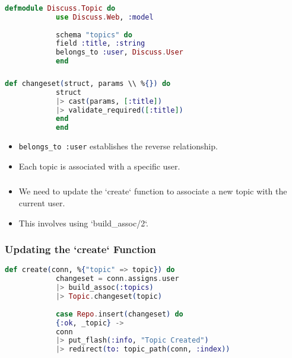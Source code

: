 \documentclass[aspectratio=169, table]{beamer}
\begin{document}
	\begin{frame}[fragile]
		\frametitle{}
		\begin{lstlisting}[language=Elixir]
			defmodule Discuss.Topic do
			use Discuss.Web, :model
			
			schema "topics" do
			field :title, :string
			belongs_to :user, Discuss.User
			end
		\end{lstlisting}
	\end{frame}
	
	\begin{frame}[fragile]
		\frametitle{}
		\begin{lstlisting}[language=Elixir]
			def changeset(struct, params \\ %{}) do
			struct
			|> cast(params, [:title])
			|> validate_required([:title])
			end
			end
		\end{lstlisting}
		\begin{itemize}
			\item \texttt{belongs\_to :user} establishes the reverse relationship.
			\item Each topic is associated with a specific user.
		\end{itemize}
	\end{frame}
	
	\begin{frame}
		\frametitle{}
		\begin{itemize}
			\item We need to update the `create` function to associate a new topic with the current user.
			\item This involves using `build\_assoc/2`.
		\end{itemize}
	\end{frame}
	
	\begin{frame}[fragile]
		\frametitle{Updating the `create` Function}
		\begin{lstlisting}[language=Elixir]
			def create(conn, %{"topic" => topic}) do
			changeset = conn.assigns.user
			|> build_assoc(:topics)
			|> Topic.changeset(topic)
			
			case Repo.insert(changeset) do
			{:ok, _topic} -> 
			conn
			|> put_flash(:info, "Topic Created")
			|> redirect(to: topic_path(conn, :index))
		\end{lstlisting}
	\end{frame}
	
\end{document}

